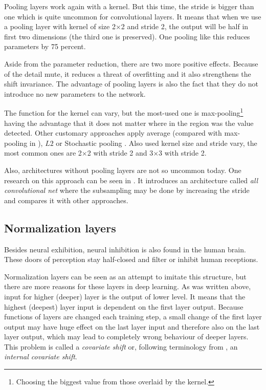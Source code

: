 Pooling layers work again with a kernel. But this time, the stride is bigger 
than one which is quite uncommon for convolutional layers. It means that when we 
use a pooling layer with kernel of size 2$\times$2 and stride 2, the output will 
be half in first two dimensions (the third one is preserved). One pooling like 
this reduces parameters by 75 percent. 

Aside from the parameter reduction, there are two more positive effects. Because 
of the detail mute, it reduces a threat of overfitting and it also strengthens 
the shift invariance. The advantage of pooling layers is also the fact that they 
do not introduce no new parameters to the network. 

The function for the kernel can vary, but the most-used one is 
max-pooling\footnote{Choosing the biggest value from those overlaid by the 
kernel.} having the advantage that it does not matter where in the region was 
the value detected. Other customary approaches apply average (compared with 
max-pooling in \cite{avg-pooling}), $L2$ \cite{l2-pooling} or Stochastic pooling 
\cite{stoch-pooling}. Also used kernel size and stride vary, the most common 
ones are 2$\times$2 with stride 2 and 3$\times$3 with stride 2. 

Also, architectures without pooling layers are not so uncommon today. One 
research on this approach can be seen in \cite{all-conv-net}. It introduces an 
architecture called \textit{all convolutional net} where the subsampling may be 
done by increasing the stride and compares it with other approaches. 

\subsection{Normalization layers}
\label{norm-layers}

Besides neural exhibition, neural inhibition is also found in the human brain. 
These doors of perception stay half-closed and filter or inhibit human 
receptions.

Normalization layers can be seen as an attempt to imitate this structure, but 
there are more reasons for these layers in deep learning. As was written above, 
input for higher (deeper) layer is the output of lower level. It means that the 
highest (deepest) layer input is dependent on the first layer output. Because 
functions of layers are changed each training step, a small change of the first 
layer output may have huge effect on the last layer input and therefore also on 
the last layer output, which may lead to completely wrong behaviour of deeper 
layers. This problem is called a \textit{covariate shift} or, following 
terminology from \cite{batch-norm}, an \textit{internal covariate shift}. 

